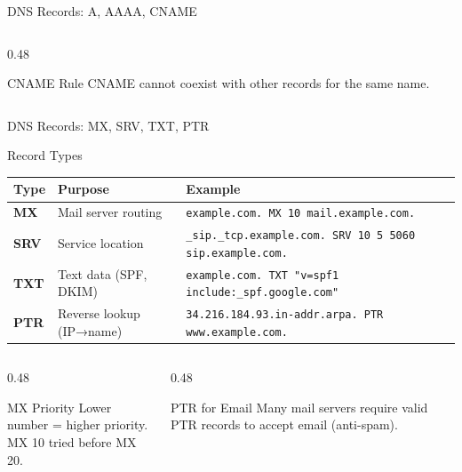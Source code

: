 \documentclass[aspectratio=169, 11pt]{beamer}
\begin{document}
\begin{frame}{DNS Records: A, AAAA, CNAME}
\begin{columns}[T]
\begin{column}{0.48\textwidth}
            \vspace{0.2em}
            \begin{exampleblock}{CNAME Rule}
                \small
                CNAME cannot coexist with other records for the same name.
            \end{exampleblock}
        \end{column}
    \end{columns}
\end{frame}

\begin{frame}{DNS Records: MX, SRV, TXT, PTR}
    \small
    \begin{block}{Record Types}
        \begin{tabular}{l l l}
            \toprule
            \textbf{Type} & \textbf{Purpose} & \textbf{Example} \\
            \midrule
            \textbf{MX} & Mail server routing & \texttt{example.com. MX 10 mail.example.com.} \\
            \textbf{SRV} & Service location & \texttt{\_sip.\_tcp.example.com. SRV 10 5 5060 sip.example.com.} \\
            \textbf{TXT} & Text data (SPF, DKIM) & \texttt{example.com. TXT "v=spf1 include:\_spf.google.com"} \\
            \textbf{PTR} & Reverse lookup (IP→name) & \texttt{34.216.184.93.in-addr.arpa. PTR www.example.com.} \\
            \bottomrule
        \end{tabular}
    \end{block}
    
    \vspace{0.2em}
    \begin{columns}[T]
        \begin{column}{0.48\textwidth}
            \begin{exampleblock}{MX Priority}
                \small
                Lower number = higher priority. \\
                MX 10 tried before MX 20.
            \end{exampleblock}
        \end{column}
        \begin{column}{0.48\textwidth}
            \begin{alertblock}{PTR for Email}
                \small
                Many mail servers require valid PTR records to accept email (anti-spam).
            \end{alertblock}
        \end{column}
    \end{columns}
\end{frame}
\end{document}
